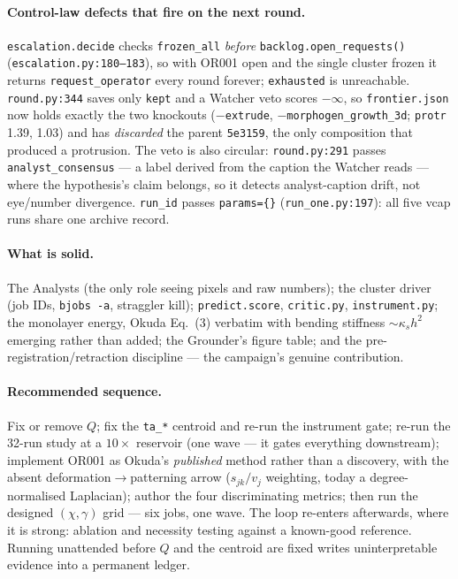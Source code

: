 \documentclass[11pt]{article}
\newcommand{\code}[1]{\texttt{#1}}
\newcommand{\op}[1]{\textcolor{cop}{\texttt{#1}}}
\begin{document}
{\paragraph{Control-law defects that fire on the next round.} \code{escalation.decide} checks
\code{frozen\_all} \emph{before} \code{backlog.open\_requests()} (\code{escalation.py:180--183}), so
with OR001 open and the single cluster frozen it returns \code{request\_operator} every round
forever; \code{exhausted} is unreachable. \code{round.py:344} saves only \code{kept} and a Watcher
veto scores $-\infty$, so \code{frontier.json} now holds exactly the two knockouts
($-$\op{extrude}, $-$\op{morphogen\_growth\_3d}; \code{protr} 1.39, 1.03) and has \emph{discarded}
the parent \code{5e3159}, the only composition that produced a protrusion. The veto is also
circular: \code{round.py:291} passes \code{analyst\_consensus} --- a label derived from the caption
the Watcher reads --- where the hypothesis's claim belongs, so it detects analyst-caption drift, not
eye/number divergence. \code{run\_id} passes \code{params=\{\}} (\code{run\_one.py:197}): all five
vcap runs share one archive record.

\paragraph{What is solid.} The Analysts (the only role seeing pixels and raw numbers); the cluster
driver (job IDs, \code{bjobs -a}, straggler kill); \code{predict.score}, \code{critic.py},
\code{instrument.py}; the monolayer energy, Okuda Eq.~(3) verbatim with bending stiffness
$\sim\kappa_s h^2$ emerging rather than added; the Grounder's figure table; and the
pre-registration/retraction discipline --- the campaign's genuine contribution.

\paragraph{Recommended sequence.} Fix or remove $Q$; fix the \code{ta\_*} centroid and re-run the
instrument gate; re-run the 32-run study at a $10\times$ reservoir (one wave --- it gates everything
downstream); implement OR001 as Okuda's \emph{published} method rather than a discovery, with the
absent deformation$\to$patterning arrow ($s_{jk}/v_j$ weighting, today a degree-normalised
Laplacian); author the four discriminating metrics; then run the designed $(\chi,\gamma)$ grid ---
six jobs, one wave. The loop re-enters afterwards, where it is strong: ablation and necessity
testing against a known-good reference. Running unattended before $Q$ and the centroid are fixed
writes uninterpretable evidence into a permanent ledger.
}
\restoregeometry
\end{document}
